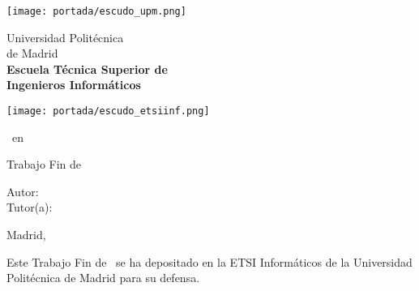 \begin{titlepage}

\begin{minipage}{0.15\linewidth}
\hspace*{-15mm}
\noindent
\texttt{[image: portada/escudo\_upm.png]}
\end{minipage}
\begin{minipage}{0.7\linewidth}
\begin{center}
\huge{ Universidad Politécnica\\de Madrid }\\
\vspace*{0.5cm}
\Large{\textbf{Escuela Técnica Superior de \\
Ingenieros Informáticos}}
\end{center}
\end{minipage}
\begin{minipage}{0.2\linewidth}
\texttt{[image: portada/escudo\_etsiinf.png]}
\end{minipage}

\vspace*{1cm}
\begin{center}
\Large{\Estudios\ en \TituloEstudios}
\end{center}

\vspace*{1cm}
\begin{center}
\huge{Trabajo Fin de \Estudios}
\end{center}

\vspace*{0.5cm}
\begin{center}
\huge\bfseries {\TituloTFG}
\end{center}

\vspace*{5cm}

\noindent
\large{Autor: \NombreAutor{} }\\
\large{Tutor(a): \NombreTutor{} }

\vspace*{3cm}
\begin{center}
Madrid, \Fecha
\end{center}

\clearpage

\thispagestyle{empty}
\noindent
Este Trabajo Fin de \Estudios\ se ha depositado en la ETSI Informáticos de la Universidad Politécnica de Madrid para su defensa.

\vspace*{4cm}


\end{titlepage}
